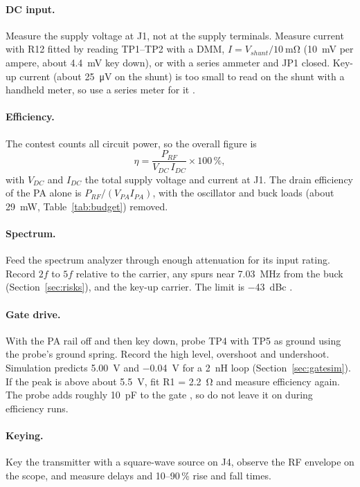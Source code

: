 \documentclass[11pt,letterpaper]{article}
\begin{document}
\paragraph{DC input.} Measure the supply voltage at J1, not at the supply terminals. Measure current with R12 fitted by reading TP1--TP2 with a DMM, $I = V_{shunt}/\SI{10}{\milli\ohm}$ (\SI{10}{\milli\volt} per ampere, about \SI{4.4}{\milli\volt} key down), or with a series ammeter and JP1 closed. Key-up current (about \SI{25}{\micro\volt} on the shunt) is too small to read on the shunt with a handheld meter, so use a series meter for it \cite{projnotes,vishayWSK2512}.

\paragraph{Efficiency.} The contest counts all circuit power, so the overall figure is
\begin{equation}
\eta = \frac{P_{RF}}{V_{DC}\, I_{DC}} \times 100\,\%,
\end{equation}
with $V_{DC}$ and $I_{DC}$ the total supply voltage and current at J1. The drain efficiency of the PA alone is $P_{RF}/(V_{PA} I_{PA})$, with the oscillator and buck loads (about \SI{29}{\milli\watt}, Table~\ref{tab:budget}) removed.

\paragraph{Spectrum.} Feed the spectrum analyzer through enough attenuation for its input rating. Record $2f$ to $5f$ relative to the carrier, any spurs near \SI{7.03}{\mega\hertz} from the buck (Section~\ref{sec:risks}), and the key-up carrier. The limit is \SI{-43}{dBc} \cite{fcc97307}.

\paragraph{Gate drive.} With the PA rail off and then key down, probe TP4 with TP5 as ground using the probe's ground spring. Record the high level, overshoot and undershoot. Simulation predicts \SI{5.00}{\volt} and \SI{-0.04}{\volt} for a \SI{2}{\nano\henry} loop (Section~\ref{sec:gatesim}). If the peak is above about \SI{5.5}{\volt}, fit R1 = \SI{2.2}{\ohm} and measure efficiency again. The probe adds roughly \SI{10}{\pico\farad} to the gate \cite{picoTA133}, so do not leave it on during efficiency runs.

\paragraph{Keying.} Key the transmitter with a square-wave source on J4, observe the RF envelope on the scope, and measure delays and 10--90\,\% rise and fall times.
\end{document}

